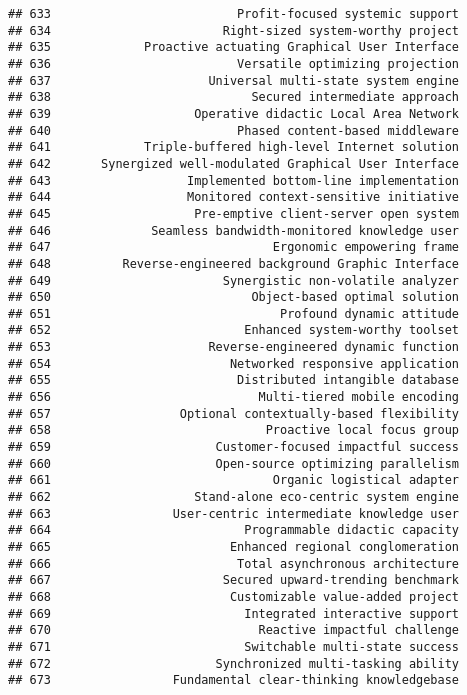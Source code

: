 \documentclass[
]{article}
\begin{document}
\begin{verbatim}
## 633                          Profit-focused systemic support
## 634                        Right-sized system-worthy project
## 635             Proactive actuating Graphical User Interface
## 636                          Versatile optimizing projection
## 637                      Universal multi-state system engine
## 638                            Secured intermediate approach
## 639                    Operative didactic Local Area Network
## 640                          Phased content-based middleware
## 641             Triple-buffered high-level Internet solution
## 642       Synergized well-modulated Graphical User Interface
## 643                   Implemented bottom-line implementation
## 644                   Monitored context-sensitive initiative
## 645                    Pre-emptive client-server open system
## 646              Seamless bandwidth-monitored knowledge user
## 647                               Ergonomic empowering frame
## 648          Reverse-engineered background Graphic Interface
## 649                        Synergistic non-volatile analyzer
## 650                            Object-based optimal solution
## 651                                Profound dynamic attitude
## 652                           Enhanced system-worthy toolset
## 653                      Reverse-engineered dynamic function
## 654                         Networked responsive application
## 655                          Distributed intangible database
## 656                             Multi-tiered mobile encoding
## 657                  Optional contextually-based flexibility
## 658                              Proactive local focus group
## 659                       Customer-focused impactful success
## 660                       Open-source optimizing parallelism
## 661                               Organic logistical adapter
## 662                    Stand-alone eco-centric system engine
## 663                 User-centric intermediate knowledge user
## 664                           Programmable didactic capacity
## 665                         Enhanced regional conglomeration
## 666                          Total asynchronous architecture
## 667                        Secured upward-trending benchmark
## 668                         Customizable value-added project
## 669                           Integrated interactive support
## 670                             Reactive impactful challenge
## 671                           Switchable multi-state success
## 672                       Synchronized multi-tasking ability
## 673                 Fundamental clear-thinking knowledgebase

\end{verbatim}
\end{document}
